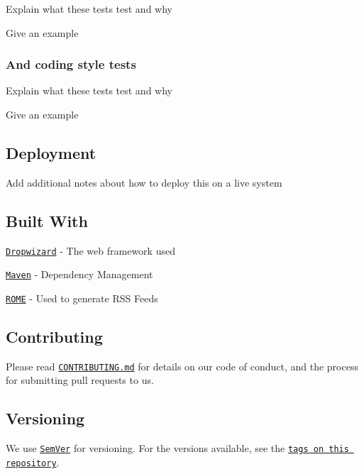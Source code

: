 Explain what these tests test and why


\begin{DoxyCode}
Give an example
\end{DoxyCode}


\subsubsection*{And coding style tests}

Explain what these tests test and why


\begin{DoxyCode}
Give an example
\end{DoxyCode}


\subsection*{Deployment}

Add additional notes about how to deploy this on a live system

\subsection*{Built With}


\begin{DoxyItemize}
\item \href{http://www.dropwizard.io/1.0.2/docs/}{\tt Dropwizard} -\/ The web framework used
\item \href{https://maven.apache.org/}{\tt Maven} -\/ Dependency Management
\item \href{https://rometools.github.io/rome/}{\tt R\+O\+ME} -\/ Used to generate R\+SS Feeds
\end{DoxyItemize}

\subsection*{Contributing}

Please read \href{https://gist.github.com/PurpleBooth/b24679402957c63ec426}{\tt C\+O\+N\+T\+R\+I\+B\+U\+T\+I\+N\+G.\+md} for details on our code of conduct, and the process for submitting pull requests to us.

\subsection*{Versioning}

We use \href{http://semver.org/}{\tt Sem\+Ver} for versioning. For the versions available, see the \href{https://github.com/your/project/tags}{\tt tags on this repository}.


